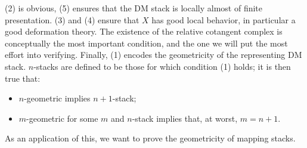 \begin{rem}
(2) is obvious, (5) ensures that the DM stack is locally almost of finite presentation. (3) and (4) ensure that $X$ has good
local behavior, in particular a good deformation theory. The existence of the relative cotangent complex is conceptually
the most important condition, and the one we will put the most effort into verifying. Finally, (1) encodes the geometricity
of the representing DM stack. $n$-stacks are defined to be those for which condition (1) holds; it is then true that: 
\begin{itemize}
\item $n$-geometric implies $n+1$-stack;
\item $m$-geometric for some $m$ and $n$-stack implies that, at worst, $m=n+1$.
\end{itemize}
\end{rem}

As an application of this, we want to prove the geometricity of mapping stacks.


